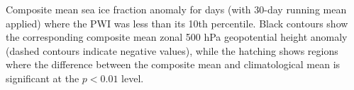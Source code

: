 \label{fig:sic_zonal_composite}
Composite mean sea ice fraction anomaly for days (with 30-day running mean applied) where the PWI was less than its 10th percentile. Black contours show the corresponding composite mean zonal 500 hPa geopotential height anomaly (dashed contours indicate negative values), while the hatching shows regions where the difference between the composite mean and climatological mean is significant at the $p < 0.01$ level. 